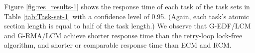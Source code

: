 Figure \ref{fig:res_results-1} shows the response time of each task of the task sets in Table \ref{tab:Task-set-1} with a confidence level of 0.95. (Again, each task's atomic section length is equal to half of the task length.) 
We observe that G-EDF/LCM and G-RMA/LCM achieve shorter 
response time than the retry-loop lock-free
algorithm, and shorter 
or comparable response time than ECM and RCM.

\begin{figure}[htbp]
\end{figure}
